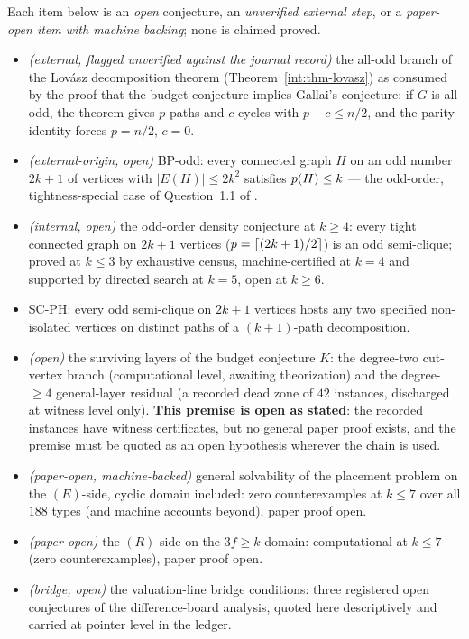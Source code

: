 Each item below is an \emph{open} conjecture, an \emph{unverified external step}, or a
\emph{paper-open item with machine backing}; none is claimed proved.
\begin{itemize}[leftmargin=2em,itemsep=0.1em]
\item \emph{(external, flagged unverified against the journal record)} the all-odd
branch of the Lov\'asz decomposition theorem (Theorem~\ref{int:thm-lovasz}) as consumed by
the proof that the budget conjecture implies Gallai's conjecture: if $G$ is all-odd, the
theorem gives $p$ paths and $c$ cycles with $p+c\le n/2$, and the parity identity forces
$p=n/2$, $c=0$.
\item \emph{(external-origin, open)} BP-odd: every connected graph $H$ on an odd
number $2k+1$ of vertices with $|E(H)|\le 2k^2$ satisfies $p(H)\le k$ --- the odd-order,
tightness-special case of Question~1.1 of \cite{BP19}.
\item \emph{(internal, open)} the odd-order density conjecture at $k\ge4$: every
tight connected graph on $2k+1$ vertices ($p=\left\lceil (2k+1)/2 \right\rceil$) is an odd semi-clique;
proved at $k\le3$ by exhaustive census, machine-certified at $k=4$ and supported by directed
search at $k=5$, open at $k\ge6$.
\item SC-PH: every odd semi-clique on $2k+1$ vertices hosts any two specified
non-isolated vertices on distinct paths of a $(k+1)$-path decomposition.
\item \emph{(open)} the surviving layers of the budget conjecture $K$: the
degree-two cut-vertex branch (computational level, awaiting theorization) and the
degree-$\ge4$ general-layer residual (a recorded dead zone of $42$ instances, discharged at
witness level only). \textbf{This premise is open as stated}: the recorded instances have
witness certificates, but no general paper proof exists, and the premise must be quoted as
an open hypothesis wherever the chain is used.
\item \emph{(paper-open, machine-backed)} general solvability of the placement
problem on the $(E)$-side, cyclic domain included: zero counterexamples at $k\le7$ over all
$188$ types (and machine accounts beyond), paper proof open.
\item \emph{(paper-open)} the $(R)$-side on the $3f\ge k$ domain: computational at
$k\le7$ (zero counterexamples), paper proof open.
\item \emph{(bridge, open)} the valuation-line bridge conditions: three registered
open conjectures of the difference-board analysis, quoted here descriptively and carried at
pointer level in the ledger.
\end{itemize}

